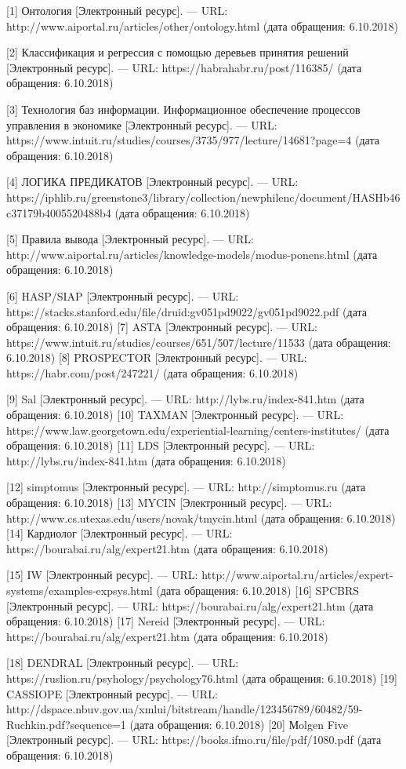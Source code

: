\documentclass[14pt,a4paper,report]{report}
\begin{document}
\begin{flushleft}

[1] Онтология [Электронный ресурс]. — URL: http://www.aiportal.ru/articles/other/ontology.html (дата обращения: 6.10.2018)

[2] Классификация и регрессия с помощью деревьев принятия решений [Электронный ресурс]. — URL: https://habrahabr.ru/post/116385/ (дата обращения: 6.10.2018)

[3] Технология баз информации. Информационное обеспечение процессов управления в экономике [Электронный ресурс]. — URL: https://www.intuit.ru/studies/courses/3735/977/lecture/14681?page=4 (дата обращения: 6.10.2018)

[4] ЛОГИКА ПРЕДИКАТОВ [Электронный ресурс]. — URL: https://iphlib.ru/greenstone3/library/collection/newphilenc/document/HASHb46c37179b4005520488b4 (дата обращения: 6.10.2018)

[5] Правила вывода [Электронный ресурс]. — URL: http://www.aiportal.ru/articles/knowledge-models/modus-ponens.html (дата обращения: 6.10.2018)

[6] HASP/SIAP [Электронный ресурс]. — URL: https://stacks.stanford.edu/file/druid:gv051pd9022/gv051pd9022.pdf (дата обращения: 6.10.2018)
[7] ASTA [Электронный ресурс]. — URL: https://www.intuit.ru/studies/courses/651/507/lecture/11533 (дата обращения: 6.10.2018)
[8] PROSPECTOR [Электронный ресурс]. — URL: https://habr.com/post/247221/ (дата обращения: 6.10.2018)

[9] Sal [Электронный ресурс]. — URL: http://lybs.ru/index-841.htm (дата обращения: 6.10.2018)
[10] TAXMAN [Электронный ресурс]. — URL: https://www.law.georgetown.edu/experiential-learning/centers-institutes/ (дата обращения: 6.10.2018)
[11] LDS [Электронный ресурс]. — URL: http://lybs.ru/index-841.htm (дата обращения: 6.10.2018)

[12] simptomus [Электронный ресурс]. — URL: http://simptomus.ru (дата обращения: 6.10.2018)
[13] MYCIN [Электронный ресурс]. — URL: http://www.cs.utexas.edu/users/novak/tmycin.html (дата обращения: 6.10.2018)
[14] Кардиолог [Электронный ресурс]. — URL: https://bourabai.ru/alg/expert21.htm (дата обращения: 6.10.2018)

[15] IW [Электронный ресурс]. — URL: http://www.aiportal.ru/articles/expert-systems/examples-expsys.html (дата обращения: 6.10.2018)
[16] SPCBRS [Электронный ресурс]. — URL: https://bourabai.ru/alg/expert21.htm (дата обращения: 6.10.2018)
[17] Nereid [Электронный ресурс]. — URL: https://bourabai.ru/alg/expert21.htm (дата обращения: 6.10.2018)

[18] DENDRAL [Электронный ресурс]. — URL: https://ruslion.ru/psyhology/psychology76.html (дата обращения: 6.10.2018)
[19] CASSIOPE [Электронный ресурс]. — URL: http://dspace.nbuv.gov.ua/xmlui/bitstream/handle/123456789/60482/59-Ruchkin.pdf?sequence=1 (дата обращения: 6.10.2018)
[20] Мolgen Five [Электронный ресурс]. — URL: https://books.ifmo.ru/file/pdf/1080.pdf (дата обращения: 6.10.2018)


\end{flushleft}
\end{document}
